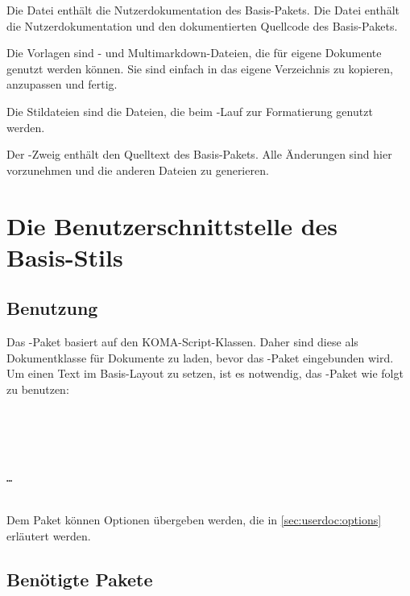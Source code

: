 Die Datei  enthält die Nutzerdokumentation des Basis-Pakets.
Die Datei  enthält die Nutzerdokumentation und den dokumentierten Quellcode des Basis-Pakets.


Die Vorlagen sind - und Multimarkdown-Dateien, die für eigene Dokumente genutzt werden können.
Sie sind einfach in das eigene Verzeichnis zu kopieren, anzupassen und fertig.


Die Stildateien sind die Dateien, die beim -Lauf zur Formatierung genutzt werden.


Der -Zweig enthält den Quelltext des Basis-Pakets.
Alle Änderungen sind hier vorzunehmen und die anderen Dateien zu generieren.



\section{Die Benutzerschnittstelle des Basis-Stils}

\subsection{Benutzung}

Das -Paket basiert auf den KOMA-Script-Klassen.
Daher sind diese als Dokumentklasse für Dokumente zu laden, bevor das -Paket eingebunden wird.
Um einen Text im Basis-Layout zu setzen, ist es notwendig, das -Paket wie folgt zu benutzen:

\begin{nutzung}
		\>\\
	\beispiel
		\>\\
		\>\\
		\>\\
		\>\texttt{\dots}\\
		\>\\
\end{nutzung}

Dem Paket können Optionen übergeben werden, die in \autoref{sec:userdoc:options} erläutert werden.

\subsection{Benötigte Pakete}
\label{sec:userdoc:packages}

